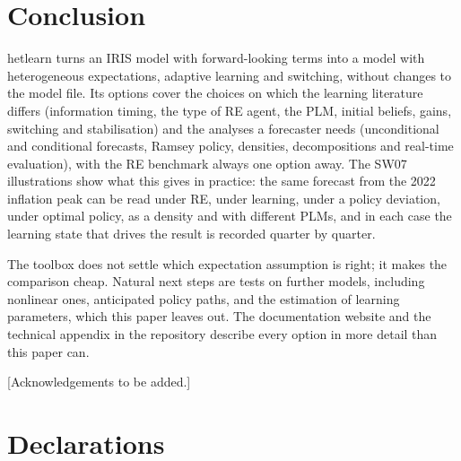 \documentclass[pdflatex,sn-basic]{sn-jnl}
\begin{document}
\section{Conclusion}\label{sec:concl}

hetlearn turns an IRIS model with forward-looking terms into a model with heterogeneous
expectations, adaptive learning and switching, without changes to the model file. Its options cover
the choices on which the learning literature differs (information timing, the type of RE agent, the
PLM, initial beliefs, gains, switching and stabilisation) and the analyses a forecaster needs
(unconditional and conditional forecasts, Ramsey policy, densities, decompositions and real-time
evaluation), with the RE benchmark always one option away. The SW07 illustrations show what this
gives in practice: the same forecast from the 2022 inflation peak can be read under RE, under
learning, under a policy deviation, under optimal policy, as a density and with different PLMs,
and in each case the learning state that drives the result is recorded quarter by quarter.

The toolbox does not settle which expectation assumption is right; it makes the comparison cheap.
Natural next steps are tests on further models, including nonlinear ones, anticipated policy
paths, and the estimation of learning parameters, which this paper leaves out. The documentation
website and the technical appendix in the repository describe every option in more detail than
this paper can.

\backmatter


[Acknowledgements to be added.]

\section*{Declarations}
\end{document}
